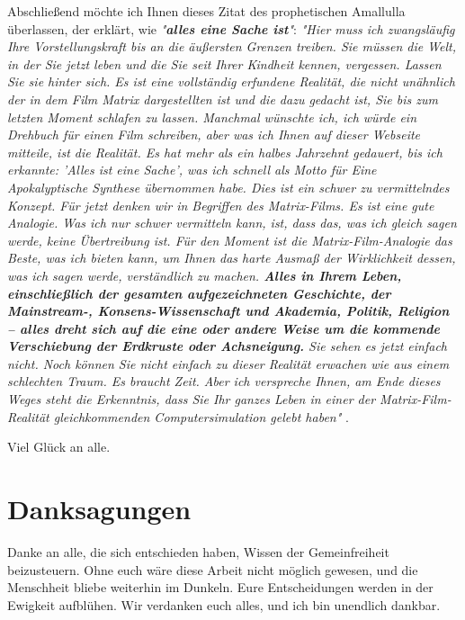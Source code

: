 \documentclass[10pt,twocolumn,letterpaper]{article}
\begin{document}
Abschließend möchte ich Ihnen dieses Zitat des prophetischen Amallulla überlassen, der erklärt, wie \textit{"\textbf{alles eine Sache ist}"}: \textit{"Hier muss ich zwangsläufig Ihre Vorstellungskraft bis an die äußersten Grenzen treiben. Sie müssen die Welt, in der Sie jetzt leben und die Sie seit Ihrer Kindheit kennen, vergessen. Lassen Sie sie hinter sich. Es ist eine vollständig erfundene Realität, die nicht unähnlich der in dem Film Matrix dargestellten ist und die dazu gedacht ist, Sie bis zum letzten Moment schlafen zu lassen. Manchmal wünschte ich, ich würde ein Drehbuch für einen Film schreiben, aber was ich Ihnen auf dieser Webseite mitteile, ist die Realität. Es hat mehr als ein halbes Jahrzehnt gedauert, bis ich erkannte: 'Alles ist eine Sache', was ich schnell als Motto für Eine Apokalyptische Synthese übernommen habe. Dies ist ein schwer zu vermittelndes Konzept. Für jetzt denken wir in Begriffen des Matrix-Films. Es ist eine gute Analogie. Was ich nur schwer vermitteln kann, ist, dass das, was ich gleich sagen werde, keine Übertreibung ist. Für den Moment ist die Matrix-Film-Analogie das Beste, was ich bieten kann, um Ihnen das harte Ausmaß der Wirklichkeit dessen, was ich sagen werde, verständlich zu machen. \textbf{Alles in Ihrem Leben, einschließlich der gesamten aufgezeichneten Geschichte, der Mainstream-, Konsens-Wissenschaft und Akademia, Politik, Religion – alles dreht sich auf die eine oder andere Weise um die kommende Verschiebung der Erdkruste oder Achsneigung.} Sie sehen es jetzt einfach nicht. Noch können Sie nicht einfach zu dieser Realität erwachen wie aus einem schlechten Traum. Es braucht Zeit. Aber ich verspreche Ihnen, am Ende dieses Weges steht die Erkenntnis, dass Sie Ihr ganzes Leben in einer der Matrix-Film-Realität gleichkommenden Computersimulation gelebt haben"} \cite{33,34}.

Viel Glück an alle.

\section{Danksagungen}

Danke an alle, die sich entschieden haben, Wissen der Gemeinfreiheit beizusteuern. Ohne euch wäre diese Arbeit nicht möglich gewesen, und die Menschheit bliebe weiterhin im Dunkeln. Eure Entscheidungen werden in der Ewigkeit aufblühen. Wir verdanken euch alles, und ich bin unendlich dankbar.

\clearpage
\twocolumn

{\small


}
\end{document}
